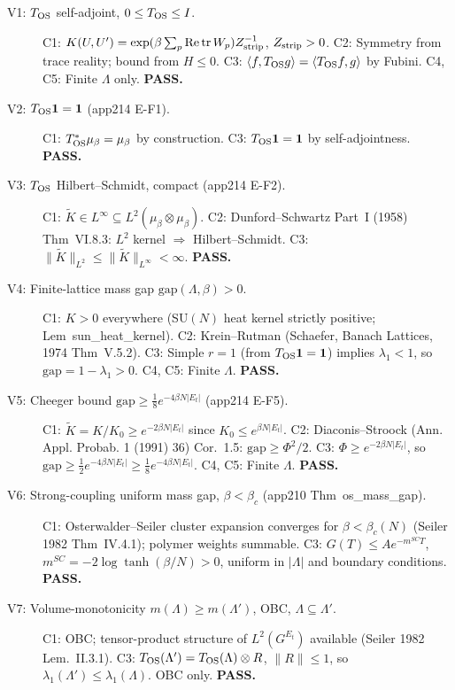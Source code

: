 \begin{description}

\item[V1: $T_{\rm OS}$ self-adjoint, $0\le T_{\rm OS}\le I$.]
C1: $K(U,U')=\exp(\beta\sum_p\operatorname{Re}\operatorname{tr}W_p)Z_{\rm strip}^{-1}$, $Z_{\rm strip}>0$.
C2: Symmetry from trace reality; bound from $H\le 0$.
C3: $\langle f,T_{\rm OS}g\rangle=\langle T_{\rm OS}f,g\rangle$ by Fubini.
C4, C5: Finite $\Lambda$ only. \textbf{PASS.}

\item[V2: $T_{\rm OS}\mathbf{1}=\mathbf{1}$ (app214 E-F1).]
C1: $T_{\rm OS}^*\mu_\beta=\mu_\beta$ by construction.
C3: $T_{\rm OS}\mathbf{1}=\mathbf{1}$ by self-adjointness. \textbf{PASS.}

\item[V3: $T_{\rm OS}$ Hilbert--Schmidt, compact (app214 E-F2).]
C1: $\tilde{K}\in L^\infty\subseteq L^2(\mu_\beta\otimes\mu_\beta)$.
C2: Dunford--Schwartz Part~I (1958) Thm~VI.8.3: $L^2$ kernel $\Rightarrow$ Hilbert--Schmidt.
C3: $\|\tilde{K}\|_{L^2}\le\|\tilde{K}\|_{L^\infty}<\infty$. \textbf{PASS.}

\item[V4: Finite-lattice mass gap $\mathrm{gap}(\Lambda,\beta)>0$.]
C1: $K>0$ everywhere (SU$(N)$ heat kernel strictly positive; Lem~sun\_heat\_kernel).
C2: Krein--Rutman (Schaefer, Banach Lattices, 1974 Thm~V.5.2).
C3: Simple $r=1$ (from $T_{\rm OS}\mathbf{1}=\mathbf{1}$) implies
$\lambda_1<1$, so $\mathrm{gap}=1-\lambda_1>0$.
C4, C5: Finite $\Lambda$. \textbf{PASS.}

\item[V5: Cheeger bound $\mathrm{gap}\ge\tfrac{1}{8}e^{-4\beta N|E_t|}$ (app214 E-F5).]
C1: $\tilde{K}=K/K_0\ge e^{-2\beta N|E_t|}$ since $K_0\le e^{\beta N|E_t|}$.
C2: Diaconis--Stroock (Ann. Appl. Probab. 1 (1991) 36) Cor.~1.5: $\mathrm{gap}\ge\Phi^2/2$.
C3: $\Phi\ge e^{-2\beta N|E_t|}$,
so $\mathrm{gap}\ge\tfrac{1}{2}e^{-4\beta N|E_t|}\ge\tfrac{1}{8}e^{-4\beta N|E_t|}$.
C4, C5: Finite $\Lambda$. \textbf{PASS.}

\item[V6: Strong-coupling uniform mass gap, $\beta<\beta_c$ (app210 Thm~os\_mass\_gap).]
C1: Osterwalder--Seiler cluster expansion converges for $\beta<\beta_c(N)$
(Seiler 1982 Thm~IV.4.1); polymer weights summable.
C3: $G(T)\le Ae^{-m^{SC}T}$, $m^{SC}=-2\log\tanh(\beta/N)>0$,
uniform in $|\Lambda|$ and boundary conditions. \textbf{PASS.}

\item[V7: Volume-monotonicity $m(\Lambda)\ge m(\Lambda')$, OBC, $\Lambda\subseteq\Lambda'$.]
C1: OBC; tensor-product structure of $L^2(G^{E_t})$ available (Seiler 1982 Lem.~II.3.1).
C3: $T_{\rm OS}(\Lambda')=T_{\rm OS}(\Lambda)\otimes R$, $\|R\|\le 1$,
so $\lambda_1(\Lambda')\le\lambda_1(\Lambda)$. OBC only. \textbf{PASS.}


\end{description}
